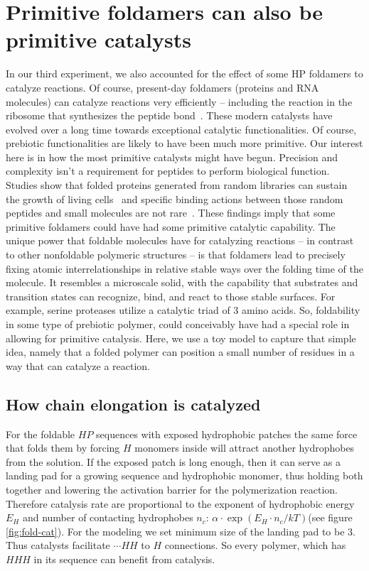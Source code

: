 \documentclass[journal=jacsat,manuscript=article,layout=twocolumn]{achemso}
\newcommand*{\ga}{\alpha}
\begin{document}
\section{Primitive foldamers can also be primitive catalysts}

 In our third experiment, we also accounted for the effect of some HP foldamers to catalyze 
reactions.  Of course, present-day foldamers (proteins and RNA molecules) can catalyze reactions 
very 
efficiently -- including the reaction in the ribosome that synthesizes the peptide 
bond~\cite{Stachelhaus1998}. These modern catalysts have evolved over a long time towards 
exceptional catalytic functionalities.  Of course, prebiotic functionalities are likely to have 
been 
much more primitive.  Our interest here is in how the most primitive catalysts might have begun.  
Precision and complexity isn't a requirement for peptides to perform biological function. Studies 
show that folded proteins generated from random libraries can sustain the growth of living 
cells~\cite{Fisher2011} and specific binding actions between those random peptides and small 
molecules are not 
rare~\cite{Cherny2012}. These findings imply that some primitive foldamers could have had some 
primitive catalytic capability.  The unique power that foldable molecules have for catalyzing 
reactions -- in contrast to 
other nonfoldable polymeric structures -- is that foldamers lead to precisely fixing atomic 
interrelationships in relative stable ways over the folding time of the molecule.  It resembles a 
microscale solid, with the capability that substrates and transition 
states can recognize, bind, and react to those stable surfaces. For example, serine proteases 
utilize a catalytic triad 
of 3 amino acids.  So, foldability in some type of prebiotic polymer, could conceivably have had a 
special role in allowing for primitive catalysis.  Here, we use a toy model to capture that simple 
idea, namely that a folded polymer can position a small number of residues in a way that can 
catalyze a reaction. 


\subsection{How chain elongation is catalyzed}

For  the foldable $HP$ sequences with exposed hydrophobic patches the same force that folds them 
by forcing $H$ monomers inside will attract another hydrophobes from the solution. 
If the exposed patch is long enough, then it can serve as a landing pad for a growing sequence and 
hydrophobic monomer, thus holding both together and lowering the activation barrier for the 
polymerization reaction. Therefore catalysis rate are proportional to the exponent of hydrophobic 
energy $E_H$ and number of contacting 
hydrophobes $n_c$: $\ga\cdot\exp(E_{H}\cdot n_{c}/kT)$(see figure \ref{fig:fold-cat}).  
For the modeling we set minimum size of the landing pad to be 3. Thus catalysts facilitate $\cdots 
HH$ to 
$H$ connections. So every polymer, which has $HHH$ in its sequence can benefit from catalysis. 
\end{document}
